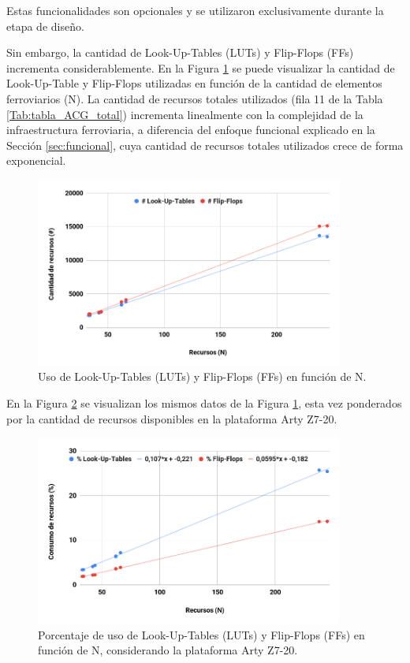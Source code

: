 	Estas funcionalidades son opcionales y se utilizaron exclusivamente durante la etapa de diseño.
	
	Sin embargo, la cantidad de Look-Up-Tables (LUTs) y Flip-Flops (FFs) incrementa considerablemente. En la Figura \ref{fig:ACG_RECURSOS_1} se puede visualizar la cantidad de Look-Up-Table y Flip-Flops utilizadas en función de la cantidad de elementos ferroviarios (N). La cantidad de recursos totales utilizados (fila 11 de la Tabla \ref{Tab:tabla_ACG_total}) incrementa linealmente con la complejidad de la infraestructura ferroviaria, a diferencia del enfoque funcional explicado en la Sección \ref{sec:funcional}, cuya cantidad de recursos totales utilizados crece de forma exponencial.	
	 	
	\begin{figure}[H]
		\centering
		\includegraphics[origin = c, width=0.9\textwidth]{resultados-obtenidos/ejemplo1/images/recursos_1}
		\centering\caption{Uso de Look-Up-Tables (LUTs) y Flip-Flops (FFs) en función de N.}
		\label{fig:ACG_RECURSOS_1}
	\end{figure}
	
	En la Figura \ref{fig:ACG_RECURSOS_2} se visualizan los mismos datos de la Figura \ref{fig:ACG_RECURSOS_1}, esta vez ponderados por la cantidad de recursos disponibles en la plataforma Arty Z7-20. 
	
	\begin{figure}[H]
		\centering
		\includegraphics[origin = c, width=0.9\textwidth]{resultados-obtenidos/ejemplo1/images/recursos_2}
		\centering\caption{Porcentaje de uso de Look-Up-Tables (LUTs) y Flip-Flops (FFs) en función de N, considerando la plataforma Arty Z7-20.}
		\label{fig:ACG_RECURSOS_2}
	\end{figure}
	
